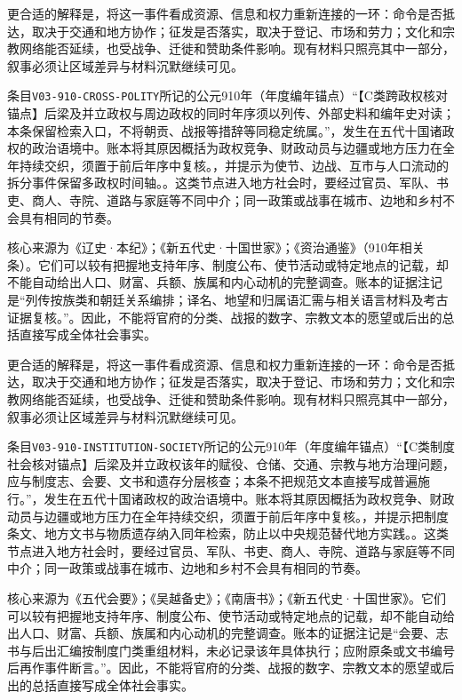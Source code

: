 更合适的解释是，将这一事件看成资源、信息和权力重新连接的一环：命令是否抵达，取决于交通和地方协作；征发是否落实，取决于登记、市场和劳力；文化和宗教网络能否延续，也受战争、迁徙和赞助条件影响。现有材料只照亮其中一部分，叙事必须让区域差异与材料沉默继续可见。

条目\texttt{V03-910-CROSS-POLITY}所记的公元910年（年度编年锚点）“【C类跨政权核对锚点】后梁及并立政权与周边政权的同时年序须以列传、外部史料和编年史对读；本条保留检索入口，不将朝贡、战报等措辞等同稳定统属。”，发生在五代十国诸政权的政治语境中。账本将其原因概括为政权竞争、财政动员与边疆或地方压力在全年持续交织，须置于前后年序中复核。，并提示为使节、边战、互市与人口流动的拆分事件保留多政权时间轴。。这类节点进入地方社会时，要经过官员、军队、书吏、商人、寺院、道路与家庭等不同中介；同一政策或战事在城市、边地和乡村不会具有相同的节奏。

核心来源为《辽史·本纪》；《新五代史·十国世家》；《资治通鉴》（910年相关条）。它们可以较有把握地支持年序、制度公布、使节活动或特定地点的记载，却不能自动给出人口、财富、兵额、族属和内心动机的完整调查。账本的证据注记是“列传按族类和朝廷关系编排；译名、地望和归属语汇需与相关语言材料及考古证据复核。”。因此，不能将官府的分类、战报的数字、宗教文本的愿望或后出的总括直接写成全体社会事实。

更合适的解释是，将这一事件看成资源、信息和权力重新连接的一环：命令是否抵达，取决于交通和地方协作；征发是否落实，取决于登记、市场和劳力；文化和宗教网络能否延续，也受战争、迁徙和赞助条件影响。现有材料只照亮其中一部分，叙事必须让区域差异与材料沉默继续可见。

条目\texttt{V03-910-INSTITUTION-SOCIETY}所记的公元910年（年度编年锚点）“【C类制度社会核对锚点】后梁及并立政权该年的赋役、仓储、交通、宗教与地方治理问题，应与制度志、会要、文书和遗存分层核查；本条不把规范文本直接写成普遍施行。”，发生在五代十国诸政权的政治语境中。账本将其原因概括为政权竞争、财政动员与边疆或地方压力在全年持续交织，须置于前后年序中复核。，并提示把制度条文、地方文书与物质遗存纳入同年检索，防止以中央规范替代地方实践。。这类节点进入地方社会时，要经过官员、军队、书吏、商人、寺院、道路与家庭等不同中介；同一政策或战事在城市、边地和乡村不会具有相同的节奏。

核心来源为《五代会要》；《吴越备史》；《南唐书》；《新五代史·十国世家》。它们可以较有把握地支持年序、制度公布、使节活动或特定地点的记载，却不能自动给出人口、财富、兵额、族属和内心动机的完整调查。账本的证据注记是“会要、志书与后出汇编按制度门类重组材料，未必记录该年具体执行；应附原条或文书编号后再作事件断言。”。因此，不能将官府的分类、战报的数字、宗教文本的愿望或后出的总括直接写成全体社会事实。

